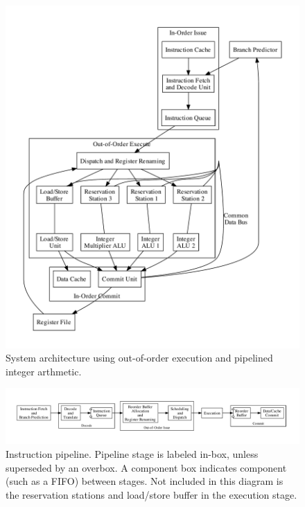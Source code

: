\documentclass[12pt]{article}
\begin{document}
\begin{figure}[ht!]
    \centering
    \includegraphics[width=\textwidth]{figures/design.pdf}
    \caption{System architecture using out-of-order execution and pipelined integer arthmetic. \label{fig:design}}
\end{figure}

\begin{figure}[h]
    \centering
    \includegraphics[width=1.1\textwidth]{figures/pipeline.pdf}
    \caption{Instruction pipeline. Pipeline stage is labeled in-box, unless superseded by an overbox. A component box indicates component (such as a FIFO) between stages. Not included in this diagram is the reservation stations and load/store buffer in the execution stage.\label{fig:pipeline}}
\end{figure}
\end{document}

